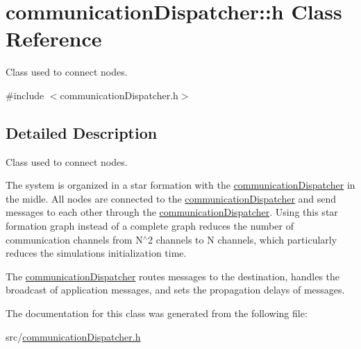 \hypertarget{classcommunication_dispatcher_1_1h}{}\section{communication\+Dispatcher\+:\+:h Class Reference}
\label{classcommunication_dispatcher_1_1h}


Class used to connect nodes.  




{\ttfamily \#include $<$communication\+Dispatcher.\+h$>$}



\subsection{Detailed Description}
Class used to connect nodes. 

The system is organized in a star formation with the \hyperlink{namespacecommunication_dispatcher}{communication\+Dispatcher} in the midle. All nodes are connected to the \hyperlink{namespacecommunication_dispatcher}{communication\+Dispatcher} and send messages to each other through the \hyperlink{namespacecommunication_dispatcher}{communication\+Dispatcher}. Using this star formation graph instead of a complete graph reduces the number of communication channels from N$^\wedge$2 channels to N channels, which particularly reduces the simulation\textquotesingle{}s initialization time.

The \hyperlink{namespacecommunication_dispatcher}{communication\+Dispatcher} routes messages to the destination, handles the broadcast of application messages, and sets the propagation delays of messages. 

The documentation for this class was generated from the following file\+:\begin{DoxyCompactItemize}
\item 
src/\hyperlink{communication_dispatcher_8h}{communication\+Dispatcher.\+h}\end{DoxyCompactItemize}
